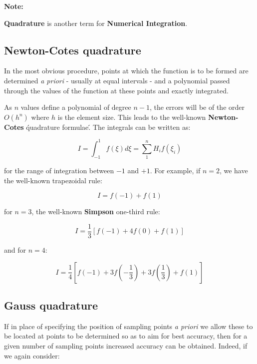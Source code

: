 \begin{bbox}
    \textbf{Note:}

    \textbf{Quadrature} is another term for \textbf{Numerical Integration}.
\end{bbox}


\subsection{Newton-Cotes quadrature}
In the most obvious procedure, points at which the function is to be formed are
determined \textit{a priori} - usually at equal intervals - and a polynomial
passed through the values of the function at these points and exactly integrated.

As $ n $ values define a polynomial of degree $ n - 1 $, the errors will be
of the order $ O(h^n) $ where $ h $ is the element size. This leads to the
well-known \textbf{Newton-Cotes} \'quadrature formulae\'. The integrals can be
written as:

\begin{equation}
    I = \int_{-1}^{1} f(\xi) d\xi = \sum_1^n H_i f(\xi_i)
\end{equation}

for the range of integration between $ -1 $ and $ +1 $. For example, if $ n = 2 $,
we have the well-known trapezoidal rule:

\begin{equation}
    I = f(-1) + f(1)
\end{equation}

for $ n = 3 $, the well-known \textbf{Simpson} one-third rule:

\begin{equation}
    I = \frac{1}{3} \left[ f(-1) + 4f(0) + f(1) \right]
\end{equation}

and for $ n = 4 $:

\begin{equation}
    I = \frac{1}{4} \left[f(-1) + 3f(-\frac{1}{3}) + 3f(\frac{1}{3}) + f(1) \right]
\end{equation}


\subsection{Gauss quadrature}

If in place of specifying the position of sampling points \textit{a priori} we
allow these to be located at points to be determined so as to aim for best
accuracy, then for a given number of sampling points increased accuracy can be
obtained. Indeed, if we again consider:

